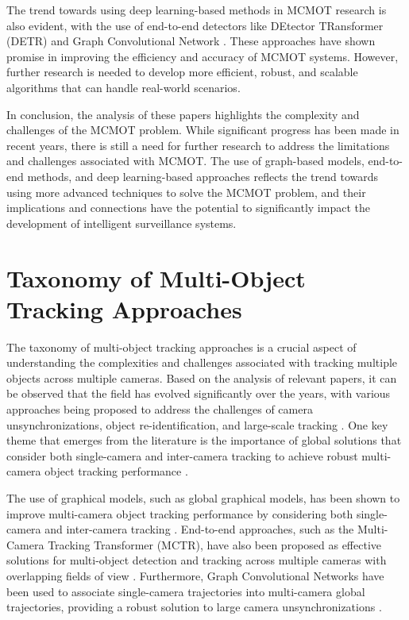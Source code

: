 \documentclass[conference]{IEEEtran}
\begin{document}
The trend towards using deep learning-based methods in MCMOT research is also evident, with the use of end-to-end detectors like DEtector TRansformer (DETR) and Graph Convolutional Network \cite{MCTR: Multi Camera Tracking Transformer, Graph Convolutional Network for Multi-Target Multi-Camera Vehicle Tracking}. These approaches have shown promise in improving the efficiency and accuracy of MCMOT systems. However, further research is needed to develop more efficient, robust, and scalable algorithms that can handle real-world scenarios.

In conclusion, the analysis of these papers highlights the complexity and challenges of the MCMOT problem. While significant progress has been made in recent years, there is still a need for further research to address the limitations and challenges associated with MCMOT. The use of graph-based models, end-to-end methods, and deep learning-based approaches reflects the trend towards using more advanced techniques to solve the MCMOT problem, and their implications and connections have the potential to significantly impact the development of intelligent surveillance systems.

\section{Taxonomy of Multi-Object Tracking Approaches}
The taxonomy of multi-object tracking approaches is a crucial aspect of understanding the complexities and challenges associated with tracking multiple objects across multiple cameras. Based on the analysis of relevant papers, it can be observed that the field has evolved significantly over the years, with various approaches being proposed to address the challenges of camera unsynchronizations, object re-identification, and large-scale tracking \cite{An equalised global graphical model-based approach for multi-camera object tracking}. One key theme that emerges from the literature is the importance of global solutions that consider both single-camera and inter-camera tracking to achieve robust multi-camera object tracking performance \cite{Multi-Camera Tracking Transformer}. 

The use of graphical models, such as global graphical models, has been shown to improve multi-camera object tracking performance by considering both single-camera and inter-camera tracking \cite{An equalised global graphical model-based approach for multi-camera object tracking}. End-to-end approaches, such as the Multi-Camera Tracking Transformer (MCTR), have also been proposed as effective solutions for multi-object detection and tracking across multiple cameras with overlapping fields of view \cite{Multi-Camera Tracking Transformer}. Furthermore, Graph Convolutional Networks have been used to associate single-camera trajectories into multi-camera global trajectories, providing a robust solution to large camera unsynchronizations \cite{Graph Convolutional Network for Multi-Target Multi-Camera Vehicle Tracking}.
\end{document}
